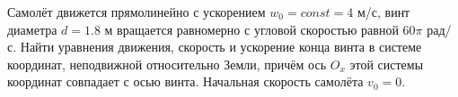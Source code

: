 Самолёт движется прямолинейно с ускорением $w_0 = const = 4$ м/с,
винт диаметра $d = 1.8$ м вращается равномерно с угловой скоростью
равной $60\pi$ рад/с.
Найти уравнения движения, скорость и ускорение конца винта в системе координат,
неподвижной относительно Земли, причём ось $O_x$ этой системы координат
совпадает с осью винта.
Начальная скорость самолёта $v_0 = 0$.
